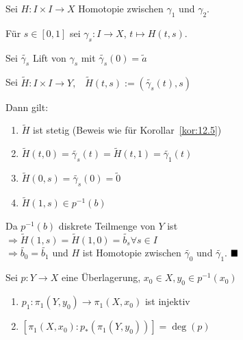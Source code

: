 \begin{beweis}
    Sei $H: I \times I \rightarrow X$ Homotopie zwischen $\gamma_1$
    und $\gamma_2$.

    Für $s \in [0,1]$ sei $\gamma_s: I \rightarrow X$, $t \mapsto H(t,s)$.

    Sei $\tilde{\gamma_s}$ Lift von $\gamma_s$ mit $\tilde{\gamma_s}(0) = \tilde{a}$

    Sei $\tilde{H}: I \times I \rightarrow Y,\;\;\; \tilde{H}(t,s) := (\tilde{\gamma_s}(t), s)$

    Dann gilt:
    \begin{enumerate}[label=(\roman*)]
        \item $\tilde{H}$ ist stetig (Beweis wie für Korollar~\ref{kor:12.5})
        \item $\tilde{H}(t,0) = \tilde{\gamma_s}(t) = \tilde{H}(t,1) = \tilde{\gamma_1}(t)$
        \item $\tilde{H}(0,s) = \tilde{\gamma_s}(0) = \tilde{0}$
        \item $\tilde{H}(1,s) \in p^{-1}(b)$
    \end{enumerate}

    Da $p^{-1}(b)$ diskrete Teilmenge von $Y$ ist\\
    $\Rightarrow \tilde{H}(1,s) = \tilde{H}(1,0) = \tilde{b_s} \forall s \in I$\\
    $\Rightarrow \tilde{b_0} = \tilde{b_1}$ und $H$ ist Homotopie 
    zwischen $\tilde{\gamma_0}$ und $\tilde{\gamma_1}$. $\qed$
\end{beweis}

\begin{korollar}%
    Sei $p: Y \rightarrow X$ eine Überlagerung, $x_0 \in X, y_0 \in p^{-1}(x_0)$
    \begin{enumerate}[label=\alph*),ref=\theplaindefinition.\alph*]
        \item $p_1: \pi_1(Y, y_0) \rightarrow \pi_1(X, x_0)$ ist injektiv\label{kor:12.8a}
        \item $[\pi_1(X, x_0): p_* (\pi_1(Y, y_0))] = \deg(p)$\label{kor:12.8b}
    \end{enumerate}
\end{korollar}

